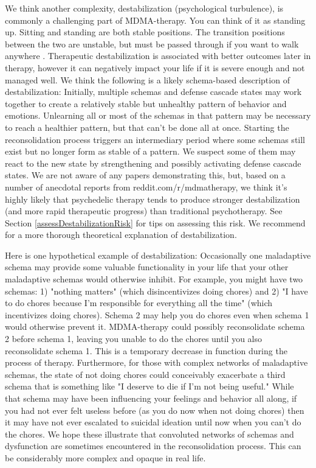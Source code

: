 \documentclass[12pt,letterpaper]{book}
\begin{document}
\label{def:destabilization}
We think another complexity, destabilization (psychological turbulence), is commonly a challenging part of MDMA-therapy. You can think of it as standing up. Sitting and standing are both stable positions. The transition positions between the two are unstable, but must be passed through if you want to walk anywhere \cite{olthofDestabilization}. Therapeutic destabilization is associated with better outcomes later in therapy, however it can negatively impact your life if it is severe enough and not managed well. We think the following is a likely schema-based description of destabilization: Initially, multiple schemas and defense cascade states may work together to create a relatively stable but unhealthy pattern of behavior and emotions. Unlearning all or most of the schemas in that pattern may be necessary to reach a healthier pattern, but that can't be done all at once. Starting the reconsolidation process triggers an intermediary period where some schemas still exist but no longer form as stable of a pattern. We suspect some of them may react to the new state by strengthening and possibly activating defense cascade states. We are not aware of any papers demonstrating this, but, based on a number of anecdotal reports from reddit.com/r/mdmatherapy, we think it's highly likely that psychedelic therapy tends to produce stronger destabilization (and more rapid therapeutic progress) than traditional psychotherapy. See Section \ref{assessDestabilizationRisk} for tips on assessing this risk. We recommend \textcite{hayes2020complex} for a more thorough theoretical explanation of destabilization.

Here is one hypothetical example of destabilization: Occasionally one maladaptive schema may provide some valuable functionality in your life that your other maladaptive schemas would otherwise inhibit. For example, you might have two schemas: 1) "nothing matters" (which disincentivizes doing chores) and 2) "I have to do chores because I'm responsible for everything all the time" (which incentivizes doing chores). Schema 2 may help you do chores even when schema 1 would otherwise prevent it. MDMA-therapy could possibly reconsolidate schema 2 before schema 1, leaving you unable to do the chores until you also reconsolidate schema 1. This is a temporary decrease in function during the process of therapy. Furthermore, for those with complex networks of maladaptive schemas, the state of not doing chores could conceivably exacerbate a third schema that is something like "I deserve to die if I'm not being useful." While that schema may have been influencing your feelings and behavior all along, if you had not ever felt useless before (as you do now when not doing chores) then it may have not ever escalated to suicidal ideation until now when you can't do the chores. We hope these illustrate that convoluted networks of schemas and dysfunction are sometimes encountered in the reconsolidation process. This can be considerably more complex and opaque in real life.
\end{document}
